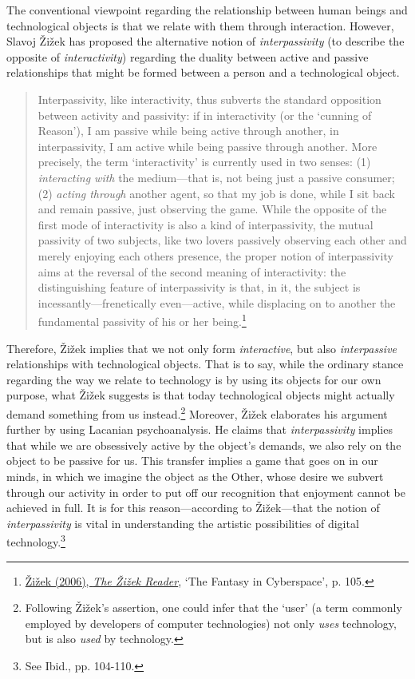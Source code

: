 The conventional viewpoint regarding the relationship between human beings and technological objects is that we relate with them through interaction. However, Slavoj \v{Z}i\v{z}ek has proposed the alternative notion of  \emph{interpassivity} (to describe the opposite of \emph{interactivity}) regarding the duality between active and passive relationships that might be formed between a person and a technological object.
\begin{quote}
Interpassivity, like interactivity, thus subverts the standard opposition between activity and passivity: if in interactivity (or the `cunning of Reason'), I am passive while being active through another, in interpassivity, I am active while being passive through another. More precisely, the term `interactivity' is currently used in two senses: (1) \emph{interacting with} the medium---that is, not being just a passive consumer; (2) \emph{acting through} another agent, so that my job is done, while I sit back and remain passive, just observing the game. While the opposite of the first mode of interactivity is also a kind of interpassivity, the mutual passivity of two subjects, like two lovers passively observing each other and merely enjoying each others presence, the proper notion of interpassivity aims at the reversal of the second meaning of interactivity: the distinguishing feature of interpassivity is that, in it, the subject is incessantly---frenetically even---active, while displacing on to another the fundamental passivity of his or her being.\footnote{\hyperlink{zizekreader}{\v{Z}i\v{z}ek (2006), \emph{The \v{Z}i\v{z}ek Reader}}, `The Fantasy in Cyberspace', p. 105.}
\end{quote}
Therefore, \v{Z}i\v{z}ek implies that we not only form \emph{interactive}, but also \emph{interpassive} relationships with technological objects. That is to say, while the ordinary stance regarding the way we relate to technology is by using its objects for our own purpose, what \v{Z}i\v{z}ek suggests is that today technological objects might actually demand something from us instead.\footnote{Following \v{Z}i\v{z}ek's assertion, one could infer that the `user' (a term commonly employed by developers of computer technologies) not only \emph{uses} technology, but is also \emph{used} by technology.} Moreover, \v{Z}i\v{z}ek elaborates his argument further by using Lacanian psychoanalysis. He claims that \emph{interpassivity} implies that while we are obsessively active by the object's demands, we also rely on the object to be passive for us. This transfer implies a game that goes on in our minds, in which we imagine the object as the Other, whose desire we subvert through our activity in order to put off our recognition that enjoyment cannot be achieved in full. It is for this reason---according to \v{Z}i\v{z}ek---that the notion of \emph{interpassivity} is vital in understanding the artistic possibilities of digital technology.\footnote{See Ibid., pp. 104-110.} 

